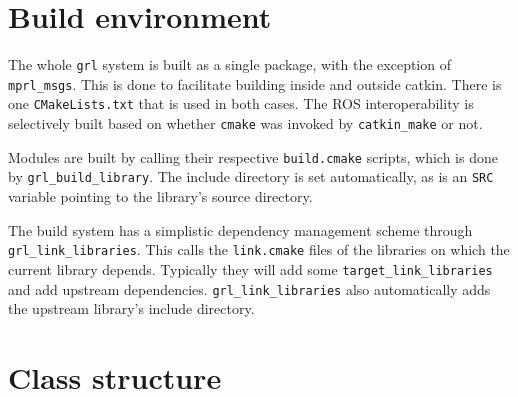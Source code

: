 \documentclass{article}
\newcommand{\txt}[1]{\texttt{#1}}
\begin{document}
\section{Build environment}

The whole \txt{grl} system is built as a single package, with the exception
of \txt{mprl\_msgs}. This is done to facilitate building inside and outside
catkin. There is one \txt{CMakeLists.txt} that is used in both cases. The
ROS interoperability is selectively built based on whether \txt{cmake} was invoked by
\txt{catkin\_make} or not.

Modules are built by calling their respective \txt{build.cmake} scripts,
which is done by \txt{grl\_build\_library}. The include directory is set
automatically, as is an \txt{SRC} variable pointing to the library's source
directory.

The build system has a simplistic dependency management scheme through
\txt{grl\_link\_libraries}. This calls the \txt{link.cmake} files of the
libraries on which the current library depends. Typically they will add some
\txt{target\_link\_libraries} and add upstream dependencies.
\txt{grl\_link\_libraries} also automatically adds the upstream library's
include directory.

\section{Class structure}
\end{document}
